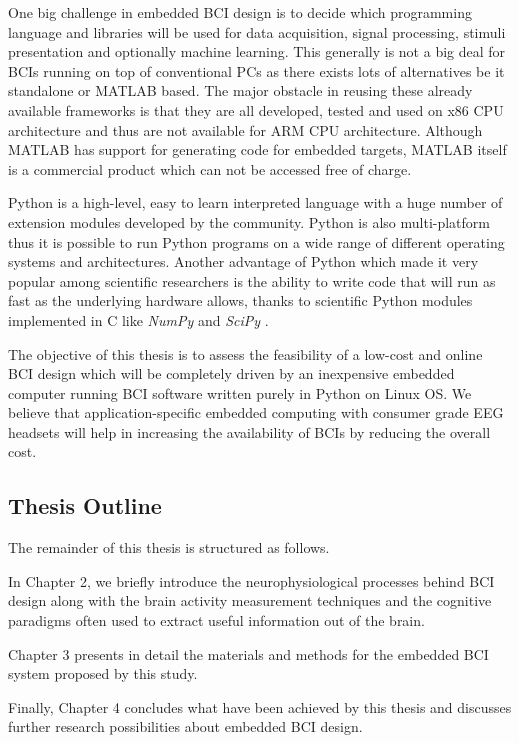\documentclass[12pt]{article}
\newcommand\mysubsection[1]{\subsection{#1}}
\numberwithin{equation}{section}
\numberwithin{figure}{section}
\numberwithin{table}{section}
\begin{document}
\par{
    One big challenge in embedded BCI design is to decide which programming
    language and libraries will be used for data acquisition,
    signal processing, stimuli presentation and optionally machine learning. This
    generally is not a big deal for BCIs running on top of conventional PCs
    as there exists lots of alternatives be it standalone or MATLAB based.
    The major obstacle in reusing these already available frameworks is that
    they are all developed, tested and used on x86 CPU architecture and thus
    are not available for ARM CPU architecture. Although MATLAB has support
    for generating code for embedded targets, MATLAB itself is
    a commercial product which can not be accessed free of charge.
}
\par{
    Python is a high-level, easy to learn interpreted language with a huge number of
    extension modules developed by the community.
    Python is also multi-platform thus it is possible
    to run Python programs on a wide range of different operating systems and
    architectures. Another advantage of Python which made it very popular
    among scientific researchers is the ability to write code that will run
    as fast as the underlying hardware allows, thanks to scientific Python modules
    implemented in C like \emph{NumPy} and \emph{SciPy} \citep{oliphant_python_2007}.
}

\par{
    The objective of this thesis is to assess the feasibility of a low-cost and online BCI
    design which will be completely driven by an inexpensive embedded computer
    running BCI software written purely in Python on Linux OS. We believe that
    application-specific embedded computing with consumer grade EEG headsets
    will help in increasing the availability of BCIs by reducing the overall cost.
}

\mysubsection{Thesis Outline}
\par
{
    The remainder of this thesis is structured as follows.
}
\par{
    In Chapter 2, we briefly introduce the neurophysiological processes
    behind BCI design along with the brain activity measurement techniques and the cognitive paradigms
    often used to extract useful information out of the brain.
}
\par{
    Chapter 3 presents in detail the materials and methods for the embedded BCI
    system proposed by this study.
}
\par{
    Finally, Chapter 4 concludes what have been achieved by this thesis and
    discusses further research possibilities about embedded BCI design.
}
\end{document}
